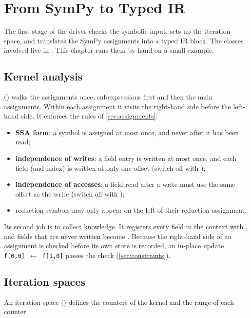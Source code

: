 \chapter{From SymPy to Typed IR}\label{ch:translation}

The first stage of the driver checks the symbolic input, sets up the iteration space,
and translates the SymPy assignments into a typed IR block. The classes involved live in
. This chapter runs them by hand on a small example.

\section{Kernel analysis}\label{sec:analysis}

 () walks the assignments once, subexpressions
first and then the main assignments. Within each assignment it visits the right-hand
side before the left-hand side. It enforces the rules of \cref{sec:assignments}:
\begin{itemize}
  \item \textbf{SSA form}: a symbol is assigned at most once, and never after it has been
        read;
  \item \textbf{independence of writes}: a field entry is written at most once, and
        each field (and index) is written at only one offset (switch off with
        );
  \item \textbf{independence of accesses}: a field read after a write must use the same
        offset as the write (switch off with );
  \item reduction symbols may only appear on the left of their reduction assignment.
\end{itemize}
Its second job is to collect knowledge. It registers every field in the context with
, and fields that are never written become
. Because the right-hand side of an assignment is checked before its own
store is recorded, an in-place update \texttt{f[0,0]}~$\leftarrow$~\texttt{f[1,0]} passes the check
(\cref{sec:constraints}).

\section{Iteration spaces}\label{sec:ispace}

An iteration space () defines the counters of the kernel and
the range of each counter.

